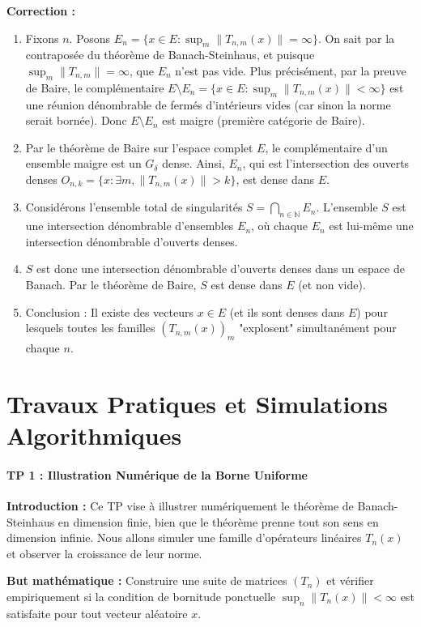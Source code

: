 \documentclass[11pt,a4paper]{article}
\begin{document}
\textbf{Correction :}
\begin{enumerate}
\item Fixons $n$. Posons $E_n = \{x \in E : \sup_m \|T_{n,m}(x)\| = \infty\}$.
   On sait par la contraposée du théorème de Banach-Steinhaus, et puisque $\sup_m \|T_{n,m}\| = \infty$, que $E_n$ n'est pas vide.
   Plus précisément, par la preuve de Baire, le complémentaire $E \setminus E_n = \{x \in E : \sup_m \|T_{n,m}(x)\| < \infty\}$ est une réunion dénombrable de fermés d'intérieurs vides (car sinon la norme serait bornée).
   Donc $E \setminus E_n$ est maigre (première catégorie de Baire).
\item Par le théorème de Baire sur l'espace complet $E$, le complémentaire d'un ensemble maigre est un $G_\delta$ dense.
   Ainsi, $E_n$, qui est l'intersection des ouverts denses $O_{n,k} = \{x : \exists m, \|T_{n,m}(x)\| > k\}$, est dense dans $E$.
\item Considérons l'ensemble total de singularités $S = \bigcap_{n \in \mathbb{N}} E_n$.
   L'ensemble $S$ est une intersection dénombrable d'ensembles $E_n$, où chaque $E_n$ est lui-même une intersection dénombrable d'ouverts denses.
\item $S$ est donc une intersection dénombrable d'ouverts denses dans un espace de Banach.
   Par le théorème de Baire, $S$ est dense dans $E$ (et non vide).
\item Conclusion : Il existe des vecteurs $x \in E$ (et ils sont denses dans $E$) pour lesquels toutes les familles $(T_{n,m}(x))_m$ "explosent" simultanément pour chaque $n$.
\end{enumerate}
\vspace{1cm}


\part{Travaux Pratiques et Simulations Algorithmiques}
\subsection*{TP 1 : Illustration Numérique de la Borne Uniforme}
\textbf{Introduction :}
Ce TP vise à illustrer numériquement le théorème de Banach-Steinhaus en dimension finie, bien que le théorème prenne tout son sens en dimension infinie. Nous allons simuler une famille d'opérateurs linéaires $T_n(x)$ et observer la croissance de leur norme.

\textbf{But mathématique :}
Construire une suite de matrices $(T_n)$ et vérifier empiriquement si la condition de bornitude ponctuelle $\sup_n \|T_n(x)\| < \infty$ est satisfaite pour tout vecteur aléatoire $x$.
\end{document}
